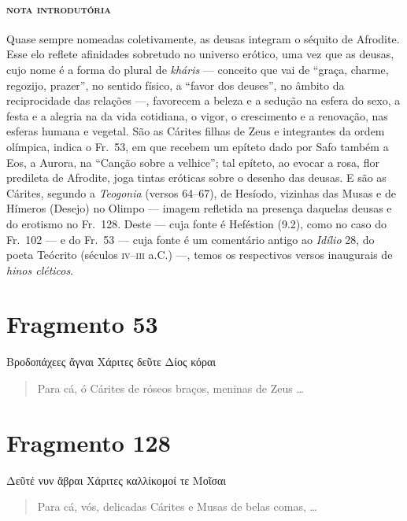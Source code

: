 {\paragraph{\textsc{nota introdutória}}
Quase sempre nomeadas coletivamente, as deusas integram o séquito de Afrodite.
Esse elo reflete afinidades sobretudo no universo erótico, uma vez que as
deusas, cujo nome é a forma do plural de \textit{kháris }--- conceito que vai de
“graça, charme, regozijo, prazer”, no sentido físico, a “favor dos deuses”, no
âmbito da reciprocidade das relações ---, favorecem a beleza e a sedução na
esfera do sexo, a festa e a alegria na da vida cotidiana, o vigor, o
crescimento e a renovação, nas esferas humana e vegetal. São as Cárites
filhas de Zeus e integrantes da ordem olímpica, indica o Fr.~53, em que
recebem um epíteto dado por Safo também a Eos, a Aurora, na ``Canção sobre a velhice'';
tal epíteto, ao evocar a rosa, flor predileta de Afrodite, joga tintas eróticas
sobre o desenho das deusas. E são as Cárites, segundo a \textit{Teogonia}
(versos 64--67), de Hesíodo, vizinhas das Musas e de Hímeros (Desejo) no Olimpo --- imagem refletida na presença daquelas deusas e do erotismo no Fr.~128. Deste --- cuja fonte é Heféstion (9.2), como no caso do Fr.~102 --- e do
Fr.~53 --- cuja fonte é um comentário antigo ao \textit{Idílio }28, do poeta
Teócrito (séculos \textsc{iv}--\textsc{iii} a.C.) ---, temos os respectivos versos inaugurais de
\textit{hinos cléticos}.

\pagebreak
\section{Fragmento 53} 

\begin{gkverse}
Βροδοπάχεες ἄγναι Χάριτες δεῦτε Δίος κόραι
\end{gkverse}

\begin{verse}
Para cá, ó Cárites de róseos braços, meninas de Zeus \ldots{}
\end{verse}\bigskip


\section{Fragmento 128} 

\begin{gkverse}
Δεῦτέ νυν ἄβραι Χάριτες καλλίκομοί τε Μοῖσαι
\end{gkverse}

\begin{verse}
Para cá, vós, delicadas Cárites e Musas de belas comas, \ldots{}
\end{verse}


}
